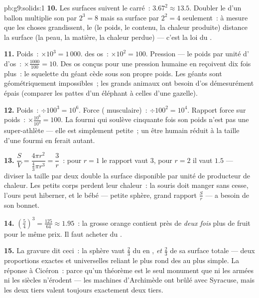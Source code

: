 \begin{solution}{pb:g9:solids:1}
\textbf{10.} Les surfaces suivent le carré~:
$3.67^2 \approx 13.5$. Doubler le  d'un ballon multiplie son
 par $2^3 = 8$ mais sa surface par $2^2 = 4$ seulement~: à
mesure que les choses grandissent, le  (le poids, le contenu,
la chaleur produite) distance la surface (la peau, la matière, la
chaleur perdue) --- c'est la loi du .

\textbf{11.} Poids~: $\times 10^3 = 1\,000$.  des os~:
$\times 10^2 = 100$. Pression --- le poids par unité d' d'os~:
$\times \frac{1000}{100} = 10$. Des os conçus pour une pression
humaine en reçoivent dix fois plus~: le squelette du géant cède sous
son propre poids. Les géants sont géométriquement impossibles~; les
grands animaux ont besoin d'os démesurément épais (comparer les
pattes d'un éléphant à celles d'une gazelle).

\textbf{12.} Poids~: $\div 100^3 = 10^6$. Force (
musculaire)~: $\div 100^2 = 10^4$. Rapport force sur poids~:
$\times \frac{10^6}{10^4} = 100$. La fourmi qui soulève cinquante
fois son poids n'est pas une super-athlète --- elle est simplement
petite~; un être humain réduit à la taille d'une fourmi en ferait
autant.

\textbf{13.} $\dfrac{S}{V} = \dfrac{4\pi r^2}{\frac43\pi r^3}
= \dfrac{3}{r}$~: pour $r = 1$ le rapport vaut $3$, pour $r = 2$ il
vaut $1.5$ --- diviser la taille par deux double la surface
disponible par unité de  producteur de chaleur. Les petits
corps perdent leur chaleur~: la souris doit manger sans cesse,
l'ours peut hiberner, et le bébé --- petite sphère, grand rapport
$\frac Sr$ --- a besoin de son bonnet.

\textbf{14.} $\left(\frac54\right)^3 = \frac{125}{64} \approx
1.95$~: la grosse orange contient près de \emph{deux fois} plus de
fruit pour le même prix. Il faut acheter du .

\textbf{15.} La gravure dit ceci~: la sphère vaut $\frac23$ du
 en , \emph{et} $\frac23$ de sa surface totale ---
deux proportions exactes et universelles reliant le plus rond des
 au plus simple. La réponse à Cicéron~: parce qu'un théorème
est le seul monument que ni les armées ni les siècles n'érodent ---
les machines d'Archimède ont brûlé avec Syracuse, mais les deux
tiers valent toujours exactement deux tiers.
\end{solution}
